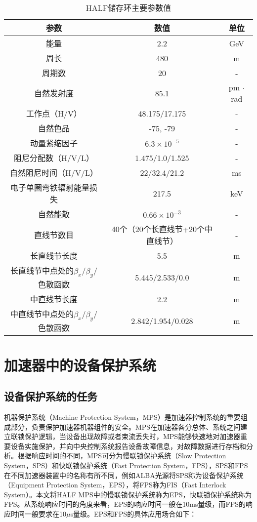 \begin{table}[!htb]
	\centering\small
	\caption{HALF储存环主要参数值}
	\label{table:4.1}
	  \begin{tabular}{ccc}
		  \toprule
		  参数        & 数值 & 单位\\
		  \midrule
		  能量  &  2.2  & GeV \\
		  周长  & 480  &  m \\
		  周期数  & 20 & - \\
		  自然发射度  & 85.1  &  pm $\cdot$ rad \\
		  工作点（H/V）  & 48.175/17.175  & - \\
		  自然色品  & -75, -79  &  - \\
		  动量紧缩因子   & $6.3\times 10^{-5}$  &  - \\
		  阻尼分配数（H/V/L）  &  1.475/1.0/1.525  & -  \\
		  自然阻尼时间（H/V/L）  & 22/32.4/21.2  & ms \\
		  电子单圈弯铁辐射能量损失 & 217.5  &  keV \\
		  自然能散  & $0.66\times 10^{-3}$   & - \\
		  直线节数目  & 40个（20个长直线节+20个中直线节）& - \\
		  长直线节长度  & 5.5& m \\
		  长直线节中点处的$\beta_{x}$/$\beta_{y}$/色散函数 & 5.445/2.533/0.0 & m \\
		  中直线节长度  & 2.2 & m \\
		  中直线节中点处的$\beta_{x}$/$\beta_{y}$/色散函数  & 2.842/1.954/0.028 & m \\
		  \bottomrule
	  \end{tabular}
\end{table}

\section{加速器中的设备保护系统}

\subsection{设备保护系统的任务}
机器保护系统（Machine Protection System，MPS）是加速器控制系统的重要组成部分，负责保护加速器机器组件的安全。MPS在加速器各分总体、系统之间建立联锁保护逻辑，当设备出现故障或者束流丢失时，MPS能够快速地对加速器重要设备实施保护，并向中央控制系统报告设备故障信息，对故障数据进行存档和分析。根据响应时间的不同，MPS可分为慢联锁保护系统（Slow Protection System，SPS）和快联锁保护系统（Fast Protection System，FPS），SPS和FPS在不同加速器装置中的名称有所不同，例如ALBA光源将SPS称为设备保护系统（Equipment Protection System，EPS），将FPS称为FIS（Fast Interlock System）\cite{Alba-eps}。本文将HALF MPS中的慢联锁保护系统称为EPS，快联锁保护系统称为FPS。从系统响应时间的角度来看，EPS的响应时间一般在10ms量级，而FPS的响应时间一般要求在10$\mu$s量级。EPS和FPS的具体应用场合如下：

